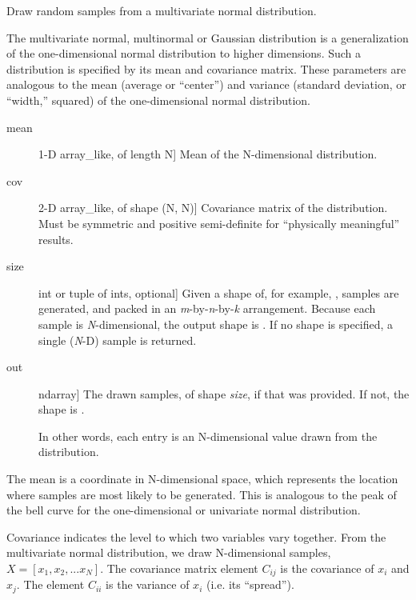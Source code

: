 \documentclass[a4paper,10pt,english]{sphinxmanual}
\begin{document}
\begin{fulllineitems}
\label{BIP.Bayes.Samplers:BIP.Bayes.Samplers.MCMC.multivariate_normal}
Draw random samples from a multivariate normal distribution.

The multivariate normal, multinormal or Gaussian distribution is a
generalization of the one-dimensional normal distribution to higher
dimensions.  Such a distribution is specified by its mean and
covariance matrix.  These parameters are analogous to the mean
(average or ``center'') and variance (standard deviation, or ``width,''
squared) of the one-dimensional normal distribution.
\begin{description}
\item[{mean}] \leavevmode{[}1-D array\_like, of length N{]}
Mean of the N-dimensional distribution.

\item[{cov}] \leavevmode{[}2-D array\_like, of shape (N, N){]}
Covariance matrix of the distribution.  Must be symmetric and
positive semi-definite for ``physically meaningful'' results.

\item[{size}] \leavevmode{[}int or tuple of ints, optional{]}
Given a shape of, for example, ,  samples are
generated, and packed in an \emph{m}-by-\emph{n}-by-\emph{k} arrangement.  Because
each sample is \emph{N}-dimensional, the output shape is .
If no shape is specified, a single (\emph{N}-D) sample is returned.

\end{description}
\begin{description}
\item[{out}] \leavevmode{[}ndarray{]}
The drawn samples, of shape \emph{size}, if that was provided.  If not,
the shape is .

In other words, each entry  is an N-dimensional
value drawn from the distribution.

\end{description}

The mean is a coordinate in N-dimensional space, which represents the
location where samples are most likely to be generated.  This is
analogous to the peak of the bell curve for the one-dimensional or
univariate normal distribution.

Covariance indicates the level to which two variables vary together.
From the multivariate normal distribution, we draw N-dimensional
samples, \(X = [x_1, x_2, ... x_N]\).  The covariance matrix
element \(C_{ij}\) is the covariance of \(x_i\) and \(x_j\).
The element \(C_{ii}\) is the variance of \(x_i\) (i.e. its
``spread'').


\end{fulllineitems}
\end{document}
